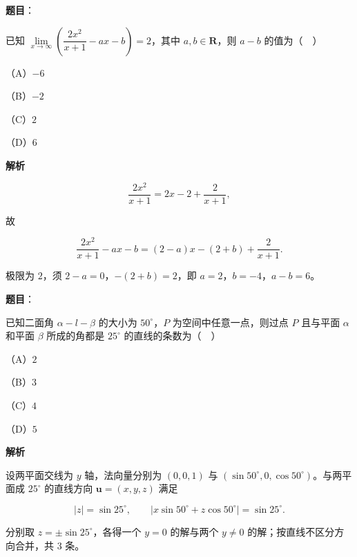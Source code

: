 \begin{answer}

\textbf{题目}：

已知 $\lim\limits_{x\to\infty}\left(\dfrac{2x^2}{x+1}-ax-b\right)=2$，其中 $a,b\in\mathbf R$，则 $a-b$ 的值为（　）

（A）$-6$

（B）$-2$

（C）$2$

（D）$6$

\textbf{解析}

\nopagebreak[4]
\[\frac{2x^2}{x+1}=2x-2+\frac2{x+1},\]

故

\nopagebreak[4]
\[\frac{2x^2}{x+1}-ax-b=(2-a)x-(2+b)+\frac2{x+1}.\]

极限为 $2$，须 $2-a=0$，$-(2+b)=2$，即 $a=2$，$b=-4$，$a-b=6$。


\end{answer}
\begin{answer}

\textbf{题目}：

已知二面角 $\alpha-l-\beta$ 的大小为 $50^\circ$，$P$ 为空间中任意一点，则过点 $P$ 且与平面 $\alpha$ 和平面 $\beta$ 所成的角都是 $25^\circ$ 的直线的条数为（　）

（A）$2$

（B）$3$

（C）$4$

（D）$5$

\textbf{解析}

设两平面交线为 $y$ 轴，法向量分别为 $(0,0,1)$ 与 $(\sin50^\circ,0,\cos50^\circ)$。与两平面成 $25^\circ$ 的直线方向 $\boldsymbol u=(x,y,z)$ 满足

\nopagebreak[4]
\[|z|=\sin25^\circ,\qquad |x\sin50^\circ+z\cos50^\circ|=\sin25^\circ.\]

分别取 $z=\pm\sin25^\circ$，各得一个 $y=0$ 的解与两个 $y\neq0$ 的解；按直线不区分方向合并，共 $3$ 条。


\end{answer}
